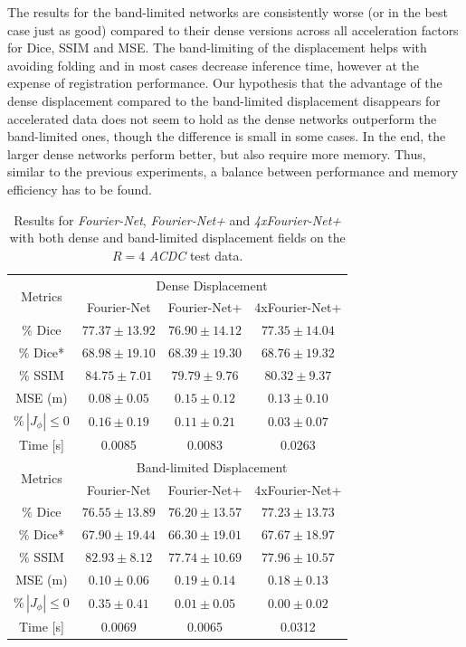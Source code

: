 \documentclass[english,version-2022-01]{uzl-thesis} %
\begin{document}
The results for the band-limited networks are consistently worse (or in the best case just as good) compared to their dense versions across all acceleration factors for Dice, SSIM and MSE. The band-limiting of the displacement helps with avoiding folding and in most cases decrease inference time, however at the expense of registration performance. Our hypothesis that the advantage of the dense displacement compared to the band-limited displacement disappears for accelerated data does not seem to hold as the dense networks outperform the band-limited ones, though the difference is small in some cases. In the end, the larger dense networks perform better, but also require more memory. Thus, similar to the previous experiments, a balance between performance and memory efficiency has to be found.


\begin{table}[h] %
	\centering
	\caption{Results for \emph{Fourier-Net}, \emph{Fourier-Net+} and \emph{4xFourier-Net+} with both dense and band-limited displacement fields on the $R=4$ \emph{ACDC} test data.}
	\label{tab:DenseDisplacementAcc4}
	\begin{tabular}{c c c c} %
		\toprule
		\multirow{2}{*}{Metrics} & \multicolumn{3}{c}{Dense Displacement} \\
		\cline{2-4} 
		 & Fourier-Net & Fourier-Net+ & 4xFourier-Net+\\	
		\midrule
		$\%$ Dice & $77.37 \pm 13.92$ & $76.90 \pm 14.12$ & $77.35 \pm 14.04$\\
		$\%$ Dice* & $68.98 \pm 19.10$ & $68.39 \pm 19.30$ & $68.76 \pm 19.32$ \\
		$\%$ SSIM & $84.75 \pm 7.01$ & $79.79 \pm 9.76$ & $80.32 \pm 9.37$\\
		MSE (m) & $0.08 \pm 0.05$ & $0.15 \pm 0.12$ & $0.13 \pm 0.10$ \\
		$\% \, |J_{\phi}|\leq0$ & $0.16 \pm 0.19$ & $0.11 \pm 0.21$ & $0.03 \pm 0.07$ \\
		Time [s] 	  & 0.0085 & 0.0083 & 0.0263  \\
		\midrule
		\multirow{2}{*}{Metrics} & \multicolumn{3}{c}{Band-limited Displacement} \\
		\cline{2-4} 
		 & Fourier-Net & Fourier-Net+ & 4xFourier-Net+\\		
		\midrule
		$\%$ Dice & $76.55 \pm 13.89$ & $76.20 \pm 13.57$ & $77.23 \pm 13.73$\\
		$\%$ Dice* & $67.90 \pm 19.44$ & $66.30 \pm 19.01$ & $67.67 \pm 18.97$ \\
		$\%$ SSIM & $82.93 \pm 8.12$ & $77.74 \pm 10.69$ & $77.96 \pm 10.57$\\
		MSE (m) & $0.10 \pm 0.06$ & $0.19 \pm 0.14$ & $0.18 \pm 0.13$ \\
		$\% \, |J_{\phi}|\leq0$ & $0.35 \pm 0.41$ & $0.01 \pm 0.05$ & $0.00 \pm 0.02$ \\
		Time [s] 	  & 0.0069  	& 0.0065 	& 0.0312  \\
		\bottomrule
	\end{tabular}	
\end{table}
\end{document}

